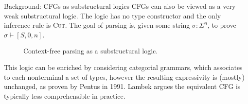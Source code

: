 \documentclass{beamer}
\begin{document}
\begin{frame}{Background: CFGs as substructural logics}
  CFGs can also be viewed as a very weak substructural logic. The logic has no type constructor and the only inference rule is \textsc{Cut}. The goal of parsing is, given some string $\sigma: \Sigma^n$, to prove $\sigma \vdash [S, 0, n]$.

\vspace{0.5cm}

\begin{figure}
\caption{Context-free parsing as a substructural logic.}
\end{figure}

  This logic can be enriched by considering categorial grammars, which associates to each nonterminal a set of types, however the resulting expressivity is (mostly) unchanged, as proven by Pentus in 1991. Lambek argues the equivalent CFG is typically less comprehensible in practice.
\end{frame}
\end{document}
